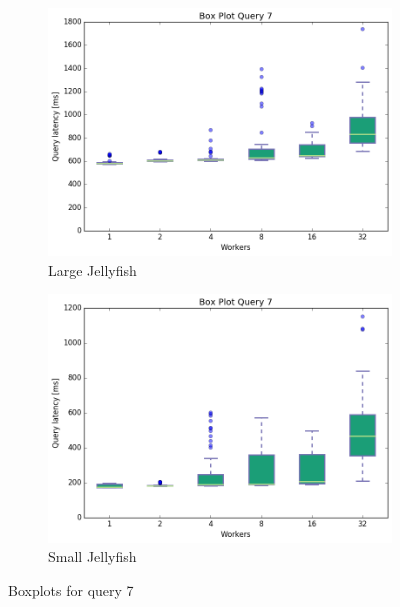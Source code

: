 \documentclass[11pt,singlecolumn]{scrartcl}
\begin{document}
\begin{figure}
\begin{subfigure}[b]{0.475\textwidth}
        \centering 
        \includegraphics[width=\textwidth]{boxesjl/q7}
        \caption[]%
        {{\small Large Jellyfish}}    
        \label{fig:mean and std of net34}
    \end{subfigure}
    \quad
    \begin{subfigure}[b]{0.475\textwidth}   
        \centering 
        \includegraphics[width=\textwidth]{boxesjs/q7}
        \caption[]%
        {{\small Small Jellyfish}}    
        \label{fig:mean and std of net44}
    \end{subfigure}
    \caption[  Boxplots for query 7 ]
    {\small Boxplots for query 7} 
    \label{fig:mean and std of nets}
\end{figure}
\clearpage

\end{document}
